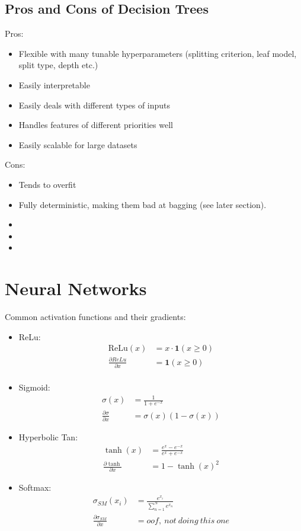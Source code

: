\documentclass{report}
\newcommand{\pd}[2]{\frac{\partial #1}{\partial #2}}
\begin{document}
\section{Pros and Cons of Decision Trees}
\begin{multicols}{2}
Pros:
\begin{itemize}
 \item Flexible with many tunable hyperparameters (splitting criterion, leaf model, split type, depth etc.)
 \item Easily interpretable
 \item Easily deals with different types of inputs
 \item Handles features of different priorities well
 \item Easily scalable for large datasets
\end{itemize}
Cons:
\begin{itemize}
 \item Tends to overfit
 \item Fully deterministic, making them bad at bagging (see later section).
 \item[\vspace{-1em}]
 \item[\vspace{-1em}]
 \item[\vspace{-1em}]
\end{itemize}
\end{multicols}
%
\chapter{Neural Networks}
Common activation functions and their gradients:
\begin{itemize}
 \item ReLu:
 \begin{align}
  \text{ReLu}(x) &= x \cdot \mathbf{1}(x \geq 0)\\
  \pd{ReLu}{x} &= \mathbf{1}(x \geq 0)\\
 \end{align}
 \item Sigmoid:
 \begin{align}
  \sigma(x) &= \frac{1}{1+e^{-x}}\\
  \pd{\sigma}{x} &= \sigma(x)(1-\sigma(x))
 \end{align}
 \item Hyperbolic Tan:
 \begin{align}
  \tanh(x) &= \frac{e^x - e^{-x}}{e^x + e^{-x}}\\
  \pd{\tanh}{x} &= 1 - \tanh(x)^2
 \end{align}
 \item Softmax:
 \begin{align}
  \sigma_{SM}(x_i) &= \frac{e^{x_i}}{\sum_{n=1}^{N} e^{x_n}}\\
  \pd{\sigma_{SM}}{x} &= oof,\ not\ doing\ this\ one
 \end{align}

\end{itemize}
%
\end{document}
